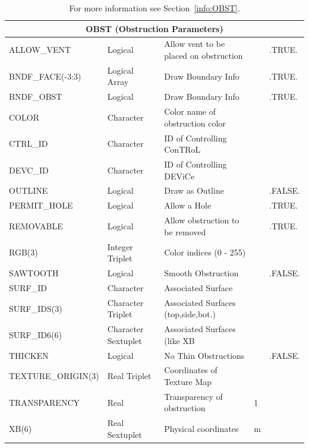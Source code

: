 \documentclass[11pt]{book}
\begin{document}
\begin{table}[H]
\caption{For more information see Section~\ref{info:OBST}.}\label{tbl:OBST}
\noindent
\begin{tabular*}{\textwidth}{@{\extracolsep{\fill}}|l|l|l|l|l|}
\hline
\multicolumn{5}{|c|}{{\ct OBST} (Obstruction Parameters)} \\ \hline \hline
{\ct ALLOW\_VENT}         & Logical             & Allow vent to be placed on obstruction&    & {\ct .TRUE.}  \\ \hline
{\ct BNDF\_FACE(-3:3)}    & Logical Array       & Draw Boundary Info                    &    & {\ct .TRUE.}  \\ \hline
{\ct BNDF\_OBST}          & Logical             & Draw Boundary Info                    &    & {\ct .TRUE.}  \\ \hline
{\ct COLOR    }           & Character           & Color name of obstruction color       &    &               \\ \hline
{\ct CTRL\_ID }           & Character           & {\ct ID} of Controlling {\ct ConTRoL} &    &               \\ \hline
{\ct DEVC\_ID }           & Character           & {\ct ID} of Controlling {\ct DEViCe}  &    &               \\ \hline
{\ct OUTLINE}             & Logical             & Draw as Outline                       &    & {\ct .FALSE.} \\ \hline
{\ct PERMIT\_HOLE}        & Logical             & Allow a Hole                          &    & {\ct .TRUE.}  \\ \hline
{\ct REMOVABLE}           & Logical             & Allow obstruction to be removed       &    & {\ct .TRUE.}  \\ \hline
{\ct RGB(3)}              & Integer Triplet     & Color indices (0 - 255)               &    &               \\ \hline
{\ct SAWTOOTH}            & Logical             & Smooth Obstruction                    &    & {\ct .FALSE.} \\ \hline
{\ct SURF\_ID}            & Character           & Associated Surface                    &    &               \\ \hline
{\ct SURF\_IDS(3)}        & Character Triplet   & Associated Surfaces (top,side,bot.)   &    &               \\ \hline
{\ct SURF\_ID6(6)}        & Character Sextuplet & Associated Surfaces (like {\ct XB}    &    &               \\ \hline
{\ct THICKEN}             & Logical             & No Thin Obstructions                  &    & {\ct .FALSE.} \\ \hline
{\ct TEXTURE\_ORIGIN(3)}  & Real Triplet        & Coordinates of Texture Map            &    &               \\ \hline
{\ct TRANSPARENCY}        & Real                & Transparency of obstruction           & 1  &               \\ \hline
{\ct XB(6) }              & Real Sextuplet      & Physical coordinates                  & m  &               \\ \hline
\end{tabular*}
\end{table}
\end{document}
